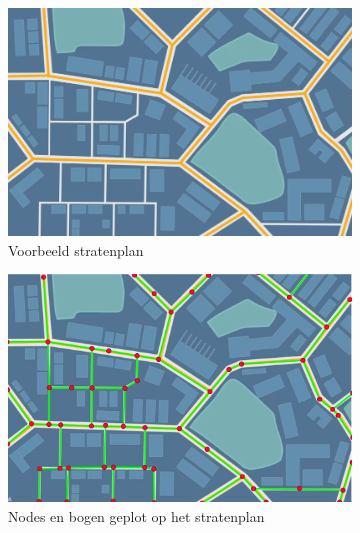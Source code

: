\begin{figure}[h]
    \caption{Voorbeeld van het genereren van een roadgraph}\label{fig:graph_generation}
    \centering
    \begin{subfigure}[b]{.4\textwidth}
        \centering
        \includegraphics[width=1\textwidth]{fig/RoadGraph/RoadMap.png}
        \caption{Voorbeeld stratenplan}
    \end{subfigure}\hfill
    \begin{subfigure}[b]{.4\textwidth}
        \centering
        \includegraphics[width=1\textwidth]{fig/RoadGraph/Graph_Over_Map.png}
        \caption{Nodes en bogen geplot op het stratenplan}
    \end{subfigure}
    \begin{subfigure}[b]{.4\textwidth}
        \centering

\end{subfigure}
\end{figure}
